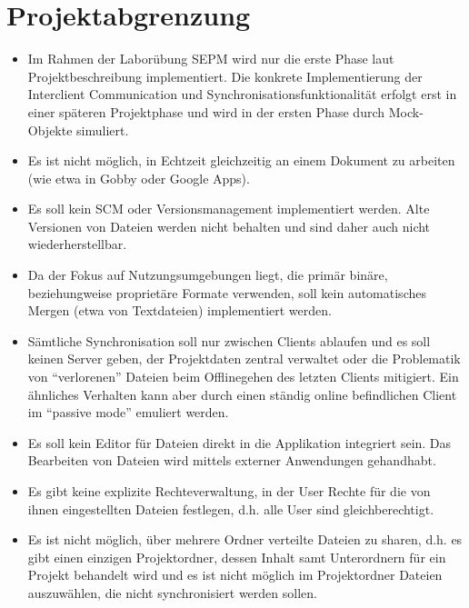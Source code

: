 
\section{Projektabgrenzung}
\begin{itemize}
  \item Im Rahmen der Laborübung SEPM wird nur die erste Phase laut Projektbeschreibung implementiert. Die konkrete Implementierung der Interclient Communication und Synchronisationsfunktionalität erfolgt erst in einer späteren Projektphase und wird in der ersten Phase durch Mock-Objekte simuliert.
  \item Es ist nicht möglich, in Echtzeit gleichzeitig an einem Dokument zu arbeiten (wie etwa in Gobby oder Google Apps).
  \item Es soll kein SCM oder Versionsmanagement implementiert werden. Alte Versionen von Dateien werden nicht behalten und sind daher auch nicht wiederherstellbar.
  \item Da der Fokus auf Nutzungsumgebungen liegt, die primär binäre, beziehungweise proprietäre Formate verwenden, soll kein automatisches Mergen (etwa von Textdateien) implementiert werden.
  \item Sämtliche Synchronisation soll nur zwischen Clients ablaufen und es soll keinen Server geben, der Projektdaten zentral verwaltet oder die Problematik von ``verlorenen'' Dateien beim Offlinegehen des letzten Clients mitigiert. Ein ähnliches Verhalten kann aber durch einen ständig online befindlichen Client im ``passive mode'' emuliert werden.
  \item Es soll kein Editor für Dateien direkt in die Applikation integriert sein. Das Bearbeiten von Dateien wird mittels externer Anwendungen gehandhabt.
  \item Es gibt keine explizite Rechteverwaltung, in der User Rechte für die von ihnen eingestellten Dateien festlegen, d.h. alle User sind gleichberechtigt.
  \item Es ist nicht möglich, über mehrere Ordner verteilte Dateien zu sharen, d.h. es gibt einen einzigen Projektordner, dessen Inhalt samt Unterordnern für ein Projekt behandelt wird und es ist nicht möglich im Projektordner Dateien auszuwählen, die nicht synchronisiert werden sollen.
\end{itemize}
